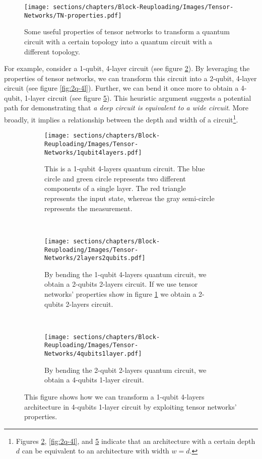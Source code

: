 \begin{itemize}
    \begin{figure}[h]
        \centering
        \texttt{[image: sections/chapters/Block-Reuploading/Images/Tensor-Networks/TN-properties.pdf]}
        \caption{Some useful properties of tensor networks to transform a quantum circuit with a certain 
        topology into a quantum circuit with a different topology.}
        \label{fig:tensor-prop}
    \end{figure}

    For example, consider a 1-qubit, 4-layer circuit (see figure \ref{fig:1q-4l}). By leveraging 
    the properties of tensor networks, we can transform this circuit into a 2-qubit, 4-layer circuit 
    (see figure \ref{fig:2q-4l}). Further, we can bend it once more to obtain a 4-qubit, 
    1-layer circuit (see figure \ref{fig:4q-1l}). This heuristic argument suggests a potential path 
    for demonstrating that \textit{a deep circuit is equivalent to a wide circuit}. 
    More broadly, it implies a relationship between the depth and width of a 
    circuit\footnote[1]{Figures \ref{fig:1q-4l}, \ref{fig:2q-4l}, and \ref{fig:4q-1l} indicate 
    that an architecture with a certain depth $d$ can be equivalent to an architecture with width 
    $w = d$.}.\\

    \begin{figure}[h]
        \centering
        \begin{subfigure}[b]{\textwidth}
            \texttt{[image: sections/chapters/Block-Reuploading/Images/Tensor-Networks/1qubit4layers.pdf]}
        \caption{This is a 1-qubit 4-layers quantum circuit. The blue circle and green circle represents two
        different components of a single layer. The red triangle represents the input state, whereas the 
        gray semi-circle represents the measurement.}
        \label{fig:1q-4l}
        \end{subfigure}
        \\[3ex]
        \begin{subfigure}[b]{\textwidth}
        \centering
            \texttt{[image: sections/chapters/Block-Reuploading/Images/Tensor-Networks/2layers2qubits.pdf]}
        \caption{By bending the 1-qubit 4-layers quantum circuit, we obtain a 2-qubits 2-layers circuit. If 
        we use tensor networks' properties show in figure \ref{fig:tensor-prop} we obtain a 2-qubits 
        2-layers circuit.}
        \label{fig:2q-2l}
        \end{subfigure}
        \\[3ex]
        \begin{subfigure}[b]{\textwidth}
        \centering
            \texttt{[image: sections/chapters/Block-Reuploading/Images/Tensor-Networks/4qubits1layer.pdf]}
        \caption{By bending the 2-qubit 2-layers quantum circuit, we obtain a 4-qubits 1-layer circuit.}
        \label{fig:4q-1l}
        \end{subfigure}
        \caption{This figure shows how we can transform a 1-qubit 4-layers architecture in 4-qubits 1-layer 
        circuit by exploiting tensor networks' properties.}
    \end{figure}


\end{itemize}
